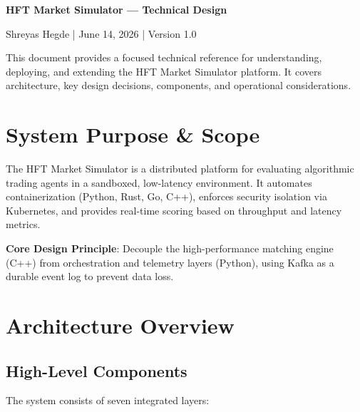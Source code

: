 \documentclass[10pt,a4paper,oneside]{report}
\begin{document}
{\centering\Large\bf HFT Market Simulator — Technical Design \par\medskip
\small Shreyas Hegde | June 14, 2026 | Version 1.0 \par}

\vspace{4pt}

This document provides a focused technical reference for understanding, deploying, and extending the HFT Market Simulator platform. It covers architecture, key design decisions, components, and operational considerations.

\vspace{8pt}
{\small\tableofcontents}
\newpage

\chapter{System Purpose \& Scope}

The HFT Market Simulator is a distributed platform for evaluating algorithmic trading agents in a sandboxed, low-latency environment. It automates containerization (Python, Rust, Go, C++), enforces security isolation via Kubernetes, and provides real-time scoring based on throughput and latency metrics.

\textbf{Core Design Principle}: Decouple the high-performance matching engine (C++) from orchestration and telemetry layers (Python), using Kafka as a durable event log to prevent data loss.

\chapter{Architecture Overview}

\section{High-Level Components}

The system consists of seven integrated layers:
\end{document}
